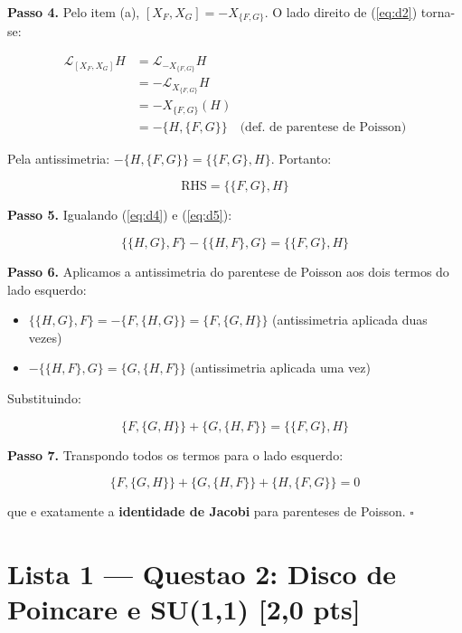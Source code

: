 \documentclass[12pt,a4paper,oneside]{article}
\begin{document}
\textbf{Passo 4.} Pelo item (a), $[X_F,X_G] = -X_{\{F,G\}}$. O lado
direito de (\ref{eq:d2}) torna-se:

\begin{align*}
\mathcal{L}_{[X_F,X_G]}H &= \mathcal{L}_{-X_{\{F,G\}}}H \\
&= -\mathcal{L}_{X_{\{F,G\}}}H \\
&= -X_{\{F,G\}}(H) \\
&= -\{H, \{F,G\}\} \quad\text{(def. de parentese de Poisson)}
\end{align*}

Pela antissimetria: $-\{H,\{F,G\}\} = \{\{F,G\}, H\}$.
Portanto:

\begin{equation}\label{eq:d5}
\text{RHS} = \{\{F,G\}, H\}
\end{equation}

\textbf{Passo 5.} Igualando (\ref{eq:d4}) e (\ref{eq:d5}):

\begin{equation}\label{eq:d6}
\{\{H,G\}, F\} - \{\{H,F\}, G\} = \{\{F,G\}, H\}
\end{equation}

\textbf{Passo 6.} Aplicamos a antissimetria do parentese de Poisson aos
dois termos do lado esquerdo:

\begin{itemize}
  \item $\{\{H,G\}, F\} = -\{F, \{H,G\}\} = \{F, \{G,H\}\}$
        (antissimetria aplicada duas vezes)
  \item $-\{\{H,F\}, G\} = \{G, \{H,F\}\}$
        (antissimetria aplicada uma vez)
\end{itemize}

Substituindo:

\begin{equation}\label{eq:d7}
\{F, \{G,H\}\} + \{G, \{H,F\}\} = \{\{F,G\}, H\}
\end{equation}

\textbf{Passo 7.} Transpondo todos os termos para o lado esquerdo:

$$\{F, \{G,H\}\} + \{G, \{H,F\}\} + \{H, \{F,G\}\} = 0$$

que e exatamente a \textbf{identidade de Jacobi} para parenteses de Poisson.
$\square$

\newpage
\section{Lista 1 — Questao 2: Disco de Poincare e SU(1,1) [2,0 pts]}
\end{document}
